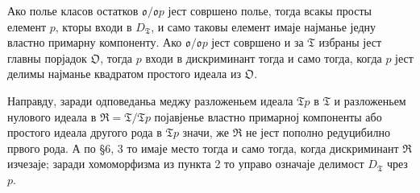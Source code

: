 \documentclass[11pt]{article}
\newcommand{\mo}{\mathfrak{o}}
\newcommand{\mO}{\mathfrak{O}}
\newcommand{\mT}{\mathfrak{T}}
\newcommand{\mR}{\mathfrak{R}}
\begin{document}
\setcounter{footnote}{29}

\noindent Ако полье класов остатков $\mo/\mo p$ јест совршено полье, тогда всакы просты елемент $p$, кторы входи в $D_\mT$, и само таковы елемент имаје најманье једну властно примарну компоненту. Ако $\mo/\mo p$ јест совршено и за $\mT$ избраны јест главны порјадок $\mO$, тогда $p$ входи в дискриминант тогда и само тогда, когда $p$ јест делимы најманье квадратом простого идеала из $\mO$.

Направду, заради одповеданьа меджу разложеньем идеала $\mT p$ в $\mT$ и разложеньем нулового идеала в $\mR=\mT/\mT p$ појавјенье властно примарној компоненты або простого идеала другого рода в $\mT p$ значи, же $\mR$ не јест пополно редуцибилно првого рода. А по §6, 3 то имаје место тогда и само тогда, когда дискриминант $\mR$ изчезаје; заради хомоморфизма из пункта 2 то управо означаје делимост $D_\mT$ чрез $p$.
\end{document}

